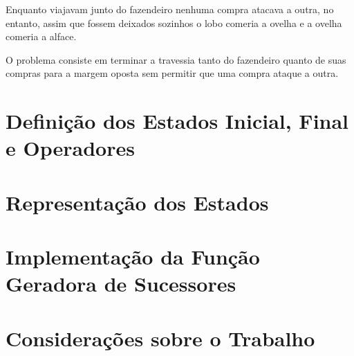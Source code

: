 \documentclass[brazil,times]{abnt}
\begin{document}
	Enquanto viajavam junto do fazendeiro nenhuma compra atacava a outra, no
	entanto, assim que fossem deixados sozinhos o lobo comeria a ovelha e a
	ovelha comeria a alface.
	
	O problema consiste em terminar a travessia tanto do fazendeiro
	quanto de suas compras para a margem oposta sem permitir que uma compra ataque
	a outra.

\section*{Definição dos Estados Inicial, Final e Operadores}
	


\section*{Representação dos Estados}


\section*{Implementação da Função Geradora de Sucessores}


\section*{Considerações sobre o Trabalho}




\end{document}
